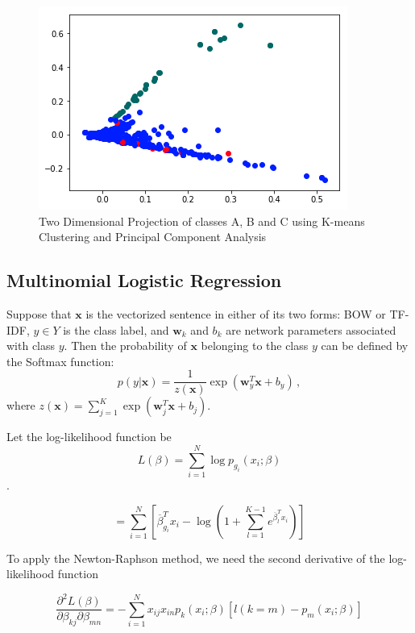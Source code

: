 \begin{figure}[t]
    \centering
    \includegraphics[width=.75\linewidth]{../Figures/pca_proj.png} 
    \caption{Two Dimensional Projection of classes A, B and C using K-means Clustering and Principal Component Analysis}
    \label{fig:kmeans_pca}
\end{figure}

\subsection{Multinomial Logistic Regression}
Suppose that $\mathbf{x}$ is the vectorized sentence in either of its two forms: BOW or TF-IDF, $y\in Y$ is the class label, and $\mathbf{w}_k$ and $b_k$ are network parameters associated with class $y$. Then the probability of $\mathbf{x}$ belonging to the class $y$ can be defined by the Softmax function:
\begin{equation}
p(y|\mathbf{x}) =\frac{1}{z(\mathbf{x})}\exp(\mathbf{w}_y^T\mathbf{x}+b_y) \,,
\label{eq:softmax}
\end{equation}
where $z(\mathbf{x}) = \sum_{j=1}^{K}\exp(\mathbf{w}_j^T\mathbf{x}+b_j)$.

Let the log-likelihood function be $$L ( \beta ) = \sum _ { i = 1 } ^ { N } \log p _ { g _ { i } } \left( x _ { i } ; \beta \right)$$. 

$$= \sum _ { i = 1 } ^ { N } \left[ \overline { \beta } _ { g _ { i } } ^ { T } x _ { i } - \log \left( 1 + \sum _ { l = 1 } ^ { K - 1 } e ^ { \overline { \beta } _ { l } ^ { T } x _ { i } } \right) \right]$$

To apply the Newton-Raphson method, we need the second derivative of the log-likelihood function

$$\frac { \partial ^ { 2 } L ( \beta ) } { \partial \beta _ { k j } \partial \beta _ { m n } } = - \sum _ { i = 1 } ^ { N } x _ { i j } x _ { i n } p _ { k } \left( x _ { i } ; \beta \right) \left[ l ( k = m ) - p _ { m } \left( x _ { i } ; \beta \right) \right]$$

